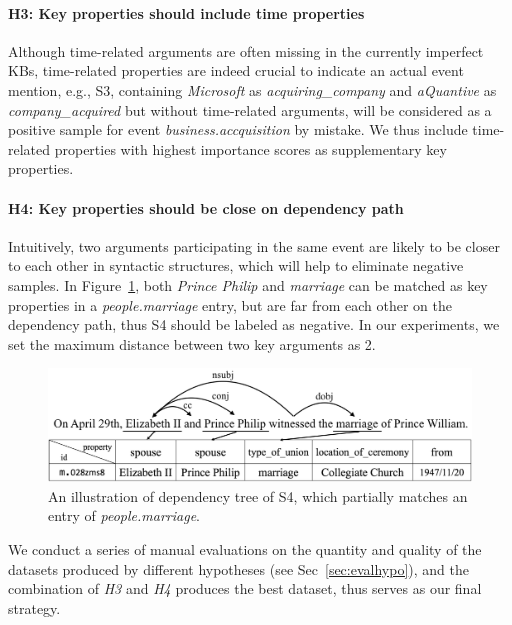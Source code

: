 \paragraph{H3: Key properties should include time properties}
Although time-related arguments are often missing in the currently imperfect KBs, time-related properties are indeed
crucial to indicate an actual event mention, e.g., S3, containing  \emph{Microsoft} as \emph{acquiring\_company} and \emph{aQuantive} as \emph{company\_acquired} but without time-related arguments, will be considered as a positive sample for event \emph{business.accquisition} by mistake.
We thus include time-related properties with highest importance scores  as supplementary key properties. 

\paragraph{H4: Key properties should be close on dependency path}
Intuitively, two arguments participating in the same event are likely to be closer to each other in syntactic structures, which will help to eliminate negative samples. In Figure~\ref{fig:2},  both  \emph{Prince Philip} and \emph{marriage} can be matched as key properties in a \textit{people.marriage} entry,  but are far from each other on the dependency path, thus S4 should be labeled as negative.
In our experiments, we set the maximum distance between two key arguments as 2.

\begin{figure}
\centering
	\includegraphics[width=.47\textwidth]{deppath}
	\caption{An illustration of dependency tree of S4, which partially matches an entry of \emph{people.marriage}. \label{fig:2}}
\end{figure}

We conduct a series of manual evaluations on the quantity and quality of the 
 datasets produced by different hypotheses (see Sec~\ref{sec:evalhypo}), 
and the combination of  \emph{H3} and \emph{H4} produces the best dataset, thus serves 
as our final strategy.
